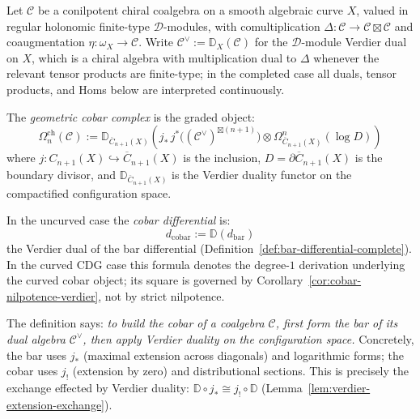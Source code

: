 \begin{definition}\label{def:geom-cobar-intrinsic}
Let $\mathcal{C}$ be a conilpotent chiral coalgebra on a smooth algebraic
curve $X$, valued in regular holonomic finite-type $\mathcal{D}$-modules,
with comultiplication
$\Delta\colon \mathcal{C} \to \mathcal{C} \boxtimes \mathcal{C}$ and
coaugmentation $\eta\colon \omega_X \to \mathcal{C}$. Write
$\mathcal{C}^\vee := \mathbb{D}_X(\mathcal{C})$ for the $\mathcal{D}$-module
Verdier dual on $X$, which is a chiral algebra with multiplication dual to
$\Delta$ whenever the relevant tensor products are finite-type; in the
completed case all duals, tensor products, and Homs below are interpreted
continuously.

The \emph{geometric cobar complex} is the graded object:
\[
\Omega^{\mathrm{ch}}_n(\mathcal{C})
:= \mathbb{D}_{\overline{C}_{n+1}(X)}\!\left(
 j_*\, j^*\bigl((\mathcal{C}^\vee)^{\boxtimes(n+1)}\bigr)
 \otimes \Omega^n_{\overline{C}_{n+1}(X)}(\log D)
\right)
\]
where $j\colon C_{n+1}(X) \hookrightarrow \overline{C}_{n+1}(X)$ is the
inclusion, $D = \partial\overline{C}_{n+1}(X)$ is the boundary divisor, and
$\mathbb{D}_{\overline{C}_{n+1}(X)}$ is the Verdier duality functor on the
compactified configuration space.

In the uncurved case the \emph{cobar differential} is:
\[
d_{\mathrm{cobar}} := \mathbb{D}(d_{\mathrm{bar}})
\]
the Verdier dual of the bar differential
(Definition~\ref{def:bar-differential-complete}). In the curved CDG
case this formula denotes the degree-$1$ derivation underlying the
curved cobar object; its square is governed by
Corollary~\ref{cor:cobar-nilpotence-verdier}, not by strict
nilpotence.
\end{definition}

\begin{remark}\label{rem:cobar-intrinsic-meaning}
The definition says: \emph{to build the cobar of a coalgebra $\mathcal{C}$,
first form the bar of its dual algebra $\mathcal{C}^\vee$, then apply
Verdier duality on the configuration space.} Concretely, the bar uses
$j_*$ (maximal extension across diagonals) and logarithmic forms; the cobar
uses $j_!$ (extension by zero) and distributional sections. This is
precisely the exchange effected by Verdier duality:
$\mathbb{D} \circ j_* \cong j_! \circ \mathbb{D}$
(Lemma~\ref{lem:verdier-extension-exchange}).
\end{remark}


